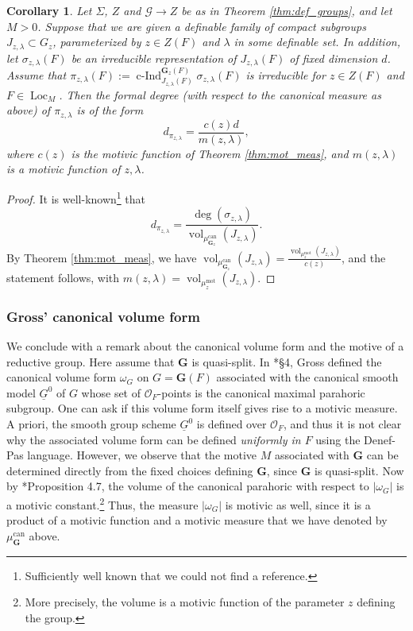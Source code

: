 \documentclass{amsart}
\newcommand{\cG}{\mathcal{G}}
\newcommand{\ri}{\mathcal{O}}
\DeclareMathOperator{\vol}{vol}
\DeclareMathOperator{\loc}{Loc}
\DeclareMathOperator{\ind}{c-Ind}
\newcommand{\bG}{\mathbf{G}}
\newcommand{\can}{\mathrm{can}}
\newcommand\mot{\mathrm{mot}}
\theoremstyle{plain}
\newtheorem{cor}[thm]{Corollary}
\theoremstyle{definition}
\begin{document}
\begin{cor} Let $\Sigma$, $Z$  and $\cG \to Z$ be as in Theorem \ref{thm:def_groups}, and let $M > 0$.
Suppose that we are given a definable family of compact subgroups $J_{z, \lambda} \subset G_z$,
parameterized by $z \in Z(F)$ and $\lambda$ in some definable set.
In addition, let $\sigma_{z, \lambda}(F)$ be an irreducible representation of $J_{z, \lambda}(F)$ of fixed dimension $d$.
Assume that $\pi_{z,\lambda}(F) := \ind_{J_{z,\lambda}(F)}^{\bG_z(F)} \sigma_{z,\lambda}(F)$
is irreducible for $z \in Z(F)$ and $F \in \loc_M$.
Then the formal degree (with respect to the canonical measure as above) of $\pi_{z, \lambda}$ is of the form 
\[
d_{\pi_{z, \lambda}}=\frac{c(z)d}{m(z, \lambda)},
\]
where $c(z)$ is the motivic function of Theorem \ref{thm:mot_meas}, and $m(z, \lambda)$ is a motivic function of $z, \lambda$. 
\end{cor}
\begin{proof}
It is well-known\footnote{Sufficiently well known that we could not find a reference.} that
\[
d_{\pi_{z, \lambda}}=\frac{\deg(\sigma_{z, \lambda})}{\vol_{\mu_{\bG_z}^\can}(J_{z, \lambda})}.
\]
By Theorem \ref{thm:mot_meas}, we have 
$\vol_{\mu_{\bG_z}^\can}(J_{z, \lambda}) = \frac{\vol_{\mu_z^\mot}(J_{z, \lambda})}{c(z)}$,
and the statement follows, with $m(z, \lambda)=\vol_{\mu_z^\mot}(J_{z, \lambda})$.
\end{proof}

\subsubsection{Gross' canonical volume form}
We conclude with a remark about the canonical volume form and the motive of a reductive group. 
Here assume that $\bG$ is quasi-split. In  \cite{gross:motive}*{\S 4}, Gross defined the canonical volume form
$\omega_G$ on $G=\bG(F)$ associated with the canonical smooth model 
$\underline{G}^0$ of $G$ whose set of $\ri_F$-points is the canonical maximal parahoric subgroup. 
One can ask if this volume form itself gives rise to a motivic measure. 
A priori, the smooth group scheme $\underline{G}^0$ is defined over $\ri_F$, and thus it is not clear why the
associated volume form can be defined \emph{uniformly in $F$} using the Denef-Pas language.
However, we observe that the motive $M$ associated with $\bG$ can be determined directly from the fixed choices defining $\bG$,
since $\bG$ is quasi-split.
Now by \cite{gross:motive}*{Proposition 4.7}, the volume of the canonical parahoric with respect to $|\omega_G|$
is a motivic constant.\footnote{More precisely, the volume is a motivic function of the parameter $z$ defining the group.}  
Thus, the measure $|\omega_G|$ is motivic as well, since it is a product of a motivic function
and a motivic measure that we have denoted by $\mu_{\bG}^\can$ above. 


\begin{bibdiv}
\begin{biblist}
\end{biblist}
\end{bibdiv}
\end{document}
